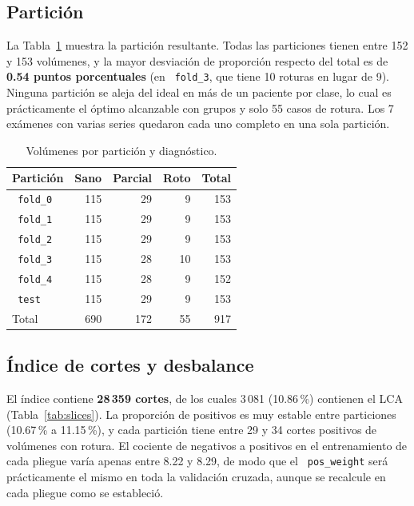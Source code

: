 \documentclass[12pt,letterpaper]{article}
\newcommand{\code}[1]{\texttt{\hyphenchar\font=-1 #1}}
\begin{document}
\subsection{Partición}

La Tabla~\ref{tab:splits} muestra la partición resultante. Todas las particiones tienen entre 152 y 153 volúmenes, y la mayor desviación de proporción respecto del total es de \textbf{0.54 puntos porcentuales} (en \code{fold\_3}, que tiene 10 roturas en lugar de 9). Ninguna partición se aleja del ideal en más de un paciente por clase, lo cual es prácticamente el óptimo alcanzable con grupos y solo 55 casos de rotura. Los 7 exámenes con varias series quedaron cada uno completo en una sola partición.

\begin{table}[!htbp]
\centering
\small
\caption{Volúmenes por partición y diagnóstico.}
\label{tab:splits}
\begin{tabular}{lrrrr}
\toprule
Partición & Sano & Parcial & Roto & Total \\
\midrule
\code{fold\_0} & 115 & 29 & 9 & 153 \\
\code{fold\_1} & 115 & 29 & 9 & 153 \\
\code{fold\_2} & 115 & 29 & 9 & 153 \\
\code{fold\_3} & 115 & 28 & 10 & 153 \\
\code{fold\_4} & 115 & 28 & 9 & 152 \\
\code{test}    & 115 & 29 & 9 & 153 \\
\midrule
Total & 690 & 172 & 55 & 917 \\
\bottomrule
\end{tabular}
\end{table}

\subsection{Índice de cortes y desbalance}

El índice contiene \textbf{28\,359 cortes}, de los cuales 3\,081 (10.86\,\%) contienen el LCA (Tabla~\ref{tab:slices}). La proporción de positivos es muy estable entre particiones (10.67\,\% a 11.15\,\%), y cada partición tiene entre 29 y 34 cortes positivos de volúmenes con rotura. El cociente de negativos a positivos en el entrenamiento de cada pliegue varía apenas entre 8.22 y 8.29, de modo que el \code{pos\_weight} será prácticamente el mismo en toda la validación cruzada, aunque se recalcule en cada pliegue como se estableció.
\end{document}
